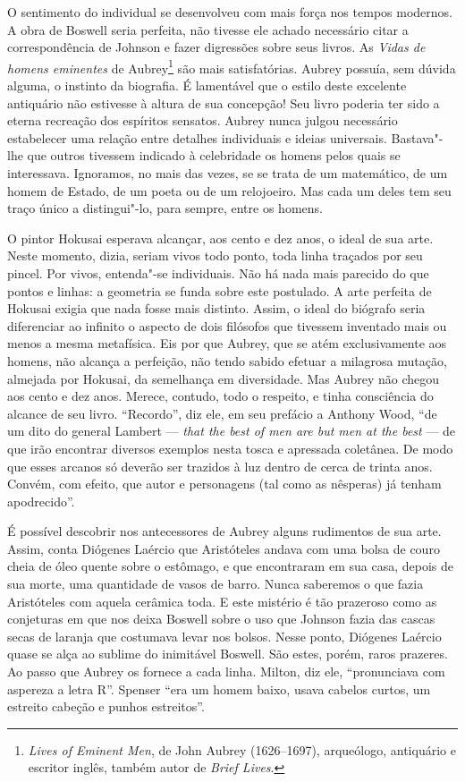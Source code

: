 O sentimento do individual se desenvolveu com mais força nos tempos
modernos. A obra de Boswell seria perfeita, não tivesse ele achado
necessário citar a correspondência de Johnson e fazer digressões sobre
seus livros. As \textit{Vidas de homens eminentes} de Aubrey\footnote{
\textit{Lives of Eminent Men}, de John Aubrey (1626--1697), arqueólogo,
antiquário e escritor inglês, também autor de \textit{Brief Lives}.} 
são mais satisfatórias. Aubrey
possuía, sem dúvida alguma, o instinto da biografia. É lamentável que o
estilo deste excelente antiquário não estivesse à altura de sua concepção!
Seu livro poderia ter sido a eterna recreação dos espíritos sensatos.
Aubrey nunca julgou necessário estabelecer uma relação entre detalhes
individuais e ideias universais. Bastava"-lhe que outros tivessem indicado
à celebridade os homens pelos quais se interessava. Ignoramos, no mais das
vezes, se se trata de um matemático, de um homem de Estado, de um poeta ou
de um relojoeiro. Mas cada um deles tem seu traço único a distingui"-lo,
para sempre, entre os homens.

O pintor Hokusai esperava alcançar, aos cento e dez anos, o ideal
de sua arte. Neste momento, dizia, seriam vivos todo ponto, toda linha
traçados por seu pincel. Por vivos, entenda"-se individuais. Não há nada
mais parecido do que pontos e linhas: a geometria se funda sobre este
postulado. A arte perfeita de Hokusai exigia que nada fosse mais distinto.
Assim, o ideal do biógrafo seria diferenciar ao infinito o aspecto de dois
filósofos que tivessem inventado mais ou menos a mesma metafísica. Eis por
que Aubrey, que se atém exclusivamente aos homens, não alcança a
perfeição, não tendo sabido efetuar a milagrosa mutação, almejada por
Hokusai, da semelhança em diversidade. Mas Aubrey não chegou aos cento e
dez anos. Merece, contudo, todo o respeito, e tinha consciência
do alcance de seu livro. “Recordo'', diz ele, em seu prefácio a Anthony
Wood, ``de um dito do general Lambert --- \textit{that the best of men are but men at
the best} --- de que irão encontrar diversos exemplos nesta tosca e
apressada coletânea. De modo que esses arcanos só deverão ser trazidos à
luz dentro de cerca de trinta anos. Convém, com efeito, que autor e
personagens (tal como as nêsperas) já  tenham apodrecido”.

É possível descobrir nos antecessores de Aubrey alguns rudimentos
de sua arte. Assim, conta Diógenes Laércio que Aristóteles andava com uma
bolsa de couro cheia de óleo quente sobre o estômago, e que encontraram em
sua casa, depois de sua morte, uma quantidade de vasos de barro. Nunca
saberemos o que fazia Aristóteles com aquela cerâmica toda. E este
mistério é tão prazeroso como as conjeturas em que nos deixa Boswell sobre
o uso que Johnson fazia das cascas secas de laranja que costumava levar
nos bolsos. Nesse ponto, Diógenes Laércio quase se alça ao sublime do
inimitável Boswell. São estes, porém, raros prazeres. Ao passo que Aubrey
os fornece a cada linha. Milton, diz ele, “pronunciava com aspereza a
letra R”. Spenser “era um homem baixo, usava cabelos curtos, um estreito
cabeção e punhos estreitos”.

